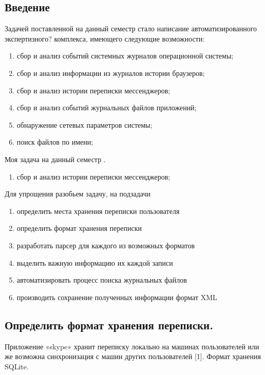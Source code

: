 \subsection{Введение}

Задачей поставленной на данный семестр стало написание автоматизированного экспертизного? комплекса, имеющего следующие возможности: \\

\begin{enumerate}
\item сбор и анализ событий системных журналов операционной системы;
\item сбор и анализ информации из журналов истории браузеров;
\item сбор и анализ истории переписки мессенджеров;
\item сбор и анализ событий журнальных файлов приложений;
\item обнаружение сетевых параметров системы;
\item поиск файлов по имени;
\end{enumerate}


Моя задача на данный семестр . \\

\begin{enumerate}
\item сбор и анализ истории переписки мессенджеров;
\end{enumerate}

Для упрощения разобьем задачу, на подзадачи
\begin{enumerate}
\item определить места хранения переписки пользователя
\item определить формат хранения переписки
\item разработать парсер для каждого из возможных форматов
\item выделить важную информацию их каждой записи
\item автоматизировать процесс поиска журнальных файлов
\item производить сохранение полученных информации формат XML
\end{enumerate}

\subsection{Определить формат хранения переписки.}

Приложение «skype» хранит переписку локально на машинах пользователей или же возможна синхронизация с машин других пользователей [1]. Формат хранения SQLite. \\

